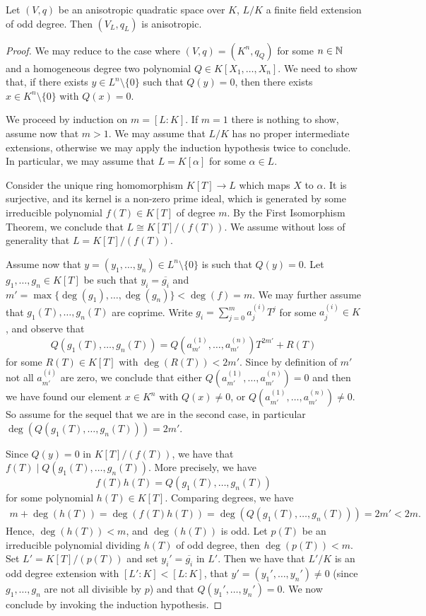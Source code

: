 \documentclass[12pt, leqno, british]{amsart}
\begin{document}
\begin{thm}[Springer]\label{T:Springer}
Let $(V, q)$ be an anisotropic quadratic space over $K$, $L/K$ a finite field extension of odd degree.
Then $(V_L, q_L)$ is anisotropic.
\end{thm}
\begin{proof}
We may reduce to the case where $(V, q) = (K^n, q_Q)$ for some $n \in \mathbb N$ and a homogeneous degree two polynomial $Q \in K[X_1, \ldots, X_n]$.
We need to show that, if there exists $y \in L^n \setminus \lbrace 0 \rbrace$ such that $Q(y) = 0$, then there exists $x \in K^n \setminus \lbrace 0 \rbrace$ with $Q(x) = 0$.

We proceed by induction on $m = [L : K]$.
If $m = 1$ there is nothing to show, assume now that $m > 1$.
We may assume that $L/K$ has no proper intermediate extensions, otherwise we may apply the induction hypothesis twice to conclude.
In particular, we may assume that $L = K[\alpha]$ for some $\alpha \in L$.

Consider the unique ring homomorphism $K[T] \to L$ which maps $X$ to $\alpha$.
It is surjective, and its kernel is a non-zero prime ideal, which is generated by some irreducible polynomial $f(T) \in K[T]$ of degree $m$.
By the First Isomorphism Theorem, we conclude that $L \cong K[T]/(f(T))$.
We assume without loss of generality that $L = K[T]/(f(T))$.

Assume now that $y = (y_1, \ldots, y_n) \in L^n \setminus \lbrace 0 \rbrace$ is such that $Q(y) = 0$.
Let $g_1, \ldots, g_n \in K[T]$ be such that $y_i = \overline{g_i}$ and $m' = \max \lbrace \deg(g_1), \ldots, \deg(g_n) \rbrace < \deg(f) = m$.
We may further assume that $g_1(T), \ldots, g_n(T)$ are coprime.
Write $g_i = \sum_{j=0}^m a_j^{(i)} T^j$ for some $a_j^{(i)} \in K$, and observe that
$$ Q(g_1(T), \ldots, g_n(T)) = Q(a_{m'}^{(1)}, \ldots, a_{m'}^{(n)})T^{2m'} + R(T)$$
for some $R(T) \in K[T]$ with $\deg(R(T)) < 2m'$.
Since by definition of $m'$ not all $a_{m'}^{(i)}$ are zero, we conclude that either $Q(a_{m'}^{(1)}, \ldots, a_{m'}^{(n)}) = 0$ and then we have found our element $x \in K^n$ with $Q(x) \neq 0$, or $Q(a_{m'}^{(1)}, \ldots, a_{m'}^{(n)}) \neq 0$.
So assume for the sequel that we are in the second case, in particular $\deg(Q(g_1(T), \ldots, g_n(T))) = 2m'$.

Since $Q(y) = 0$ in $K[T]/(f(T))$, we have that $f(T) \mid Q(g_1(T), \ldots, g_n(T))$.
More precisely, we have
$$ f(T)h(T) = Q(g_1(T), \ldots, g_n(T))$$
for some polynomial $h(T) \in K[T]$.
Comparing degrees, we have
\begin{align*}
m + \deg(h(T)) = \deg(f(T)h(T)) = \deg(Q(g_1(T), \ldots, g_n(T))) = 2m' < 2m.
\end{align*}
Hence, $\deg(h(T)) < m$, and $\deg(h(T))$ is odd.
Let $p(T)$ be an irreducible polynomial dividing $h(T)$ of odd degree, then $\deg(p(T)) < m$.
Set $L' = K[T]/(p(T))$ and set $y_i' = \overline{g_i}$ in $L'$.
Then we have that $L'/K$ is an odd degree extension with $[L' : K] < [L : K]$, that $y' = (y_1', \ldots, y_n') \neq 0$ (since $g_1, \ldots, g_n$ are not all divisible by $p$) and that $Q(y_1', \ldots, y_n') = 0$.
We now conclude by invoking the induction hypothesis.
\end{proof}
\end{document}
